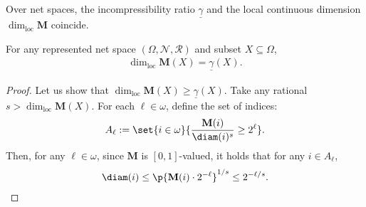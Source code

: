 Over net spaces, the incompressibility ratio $\underline{\gamma}$ and the local continuous dimension $\dim_{\operatorname{loc}}\mathbf{M}$ coincide.

\begin{theorem}
    For any represented net space $(\Omega, \mathcal{N}, \mathscr{R})$ and subset $X \subseteq \Omega$,
    \begin{align*}
        \dim_{\operatorname{loc}} \mathbf{M} (X) = \underline{\gamma}(X).
    \end{align*}
    \label{theorem:incompressibility_ratio=local_dimension}
\end{theorem}
\begin{proof}
    Let us show that $\dim_{\operatorname{loc}} \mathbf{M}(X) \geq \underline{\gamma}(X)$. Take any rational $s > \dim_{\operatorname{loc}} \mathbf{M}(X)$.  For each $\ell \in \omega$, define the set of indices:
    \begin{align*}
        A_\ell := \set{i \in \omega}{\frac{\mathbf{M}(i)}{\diam(i)^{s}} \geq 2^\ell}.
    \end{align*}
    Then, for any $\ell \in \omega$, since $\mathbf{M}$ is $[0,1]$-valued, it holds that for any $i \in A_\ell$,
    \begin{align}
        \diam(i) \leq \p{\mathbf{M}(i) \cdot 2^{-\ell}}^{1 / s} \leq 2^{-\ell / s}.
        \label{eqn:i_in_A_ell}
    \end{align}


\end{proof}
